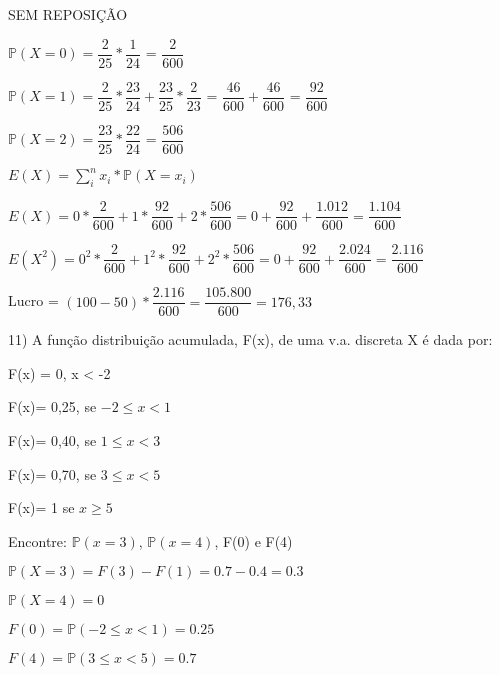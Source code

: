 \documentclass[12pt,a4paper]{article}
\begin{document}
\vspace{1.5cm}
SEM REPOSIÇÃO

\begin{center}	
	\vspace{0.5cm}
	$\mathbb{P}(X=0) = \dfrac{2}{25}*\dfrac{1}{24}$ = $\dfrac{2}{600}$
	
	\vspace{0.5cm}
	$\mathbb{P}(X=1) = \dfrac{2}{25}*\dfrac{23}{24} + \dfrac{23}{25}*\dfrac{2}{23}$ = $\dfrac{46}{600} + \dfrac{46}{600}$ = $\dfrac{92}{600}$
	
	\vspace{0.5cm}
	$\mathbb{P}(X=2) = \dfrac{23}{25}*\dfrac{22}{24}$ = $\dfrac{506}{600}$
	
	\vspace{1.5cm}
	$E(X) = \sum_{i}^{n} x_{i}*\mathbb{P}(X = x_{i})$
	
	\vspace{1cm}
	$E(X) = 0*\dfrac{2}{600}+1*\dfrac{92}{600}+2*\dfrac{506}{600} = 0 + \dfrac{92}{600} + \dfrac{1.012}{600} = \dfrac{1.104}{600}$
	
	\vspace{0.5cm}
	$E(X^{2}) = 0^{2}*\dfrac{2}{600}+1^{2}*\dfrac{92}{600}+2^{2}*\dfrac{506}{600} = 0 + \dfrac{92}{600} + \dfrac{2.024}{600} = \dfrac{2.116}{600}$
	
	\vspace{1cm}
	Lucro = $(100 - 50)*\dfrac{2.116}{600} = \dfrac{105.800}{600} = 176,33$
\end{center}

\vspace{1cm}
11) A função distribuição acumulada, F(x), de uma v.a. discreta X é dada por:

F(x) = 0, x < -2

F(x)= 0,25, se $-2\leq{x}< 1$

F(x)= 0,40, se  $1\leq{x}< 3$

F(x)= 0,70, se $3\leq{x}< 5$

F(x)= 1 se $x\geq{5}$

Encontre: $\mathbb{P}(x=3)$, $\mathbb{P}(x=4)$, F(0) e F(4) 

\begin{center}
	\vspace{0.25cm}
	$\mathbb{P}(X = 3) = F(3) - F(1) = 0.7 - 0.4 = 0.3$
	
	\vspace{0.5cm}
	$\mathbb{P}(X = 4) = 0$
	
	\vspace{0.5cm}
	$F(0) = \mathbb{P}(-2\leq{x}< 1) = 0.25$
	
	\vspace{0.5cm}
	$F(4) = \mathbb{P}(3\leq{x}< 5) = 0.7$
\end{center}
\end{document}
